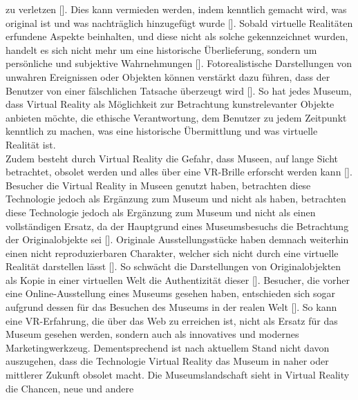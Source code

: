 \documentclass[a4paper,12pt,oneside]{article}
\begin{document}
        zu verletzen [\cite[38]{Heidsiek2019}]. Dies kann vermieden werden, indem 
        kenntlich gemacht wird, was original ist und was nachträglich hinzugefügt
        wurde [\cite[38]{Heidsiek2019}]. Sobald virtuelle Realitäten erfundene Aspekte 
        beinhalten, und diese nicht als solche gekennzeichnet wurden, handelt es sich nicht
        mehr um eine historische Überlieferung, sondern um persönliche und subjektive 
        Wahrnehmungen [\cite[38]{Heidsiek2019}]. Fotorealistische Darstellungen
        von unwahren Ereignissen oder Objekten können verstärkt dazu führen, dass der
        Benutzer von einer fälschlichen Tatsache überzeugt wird [\cite[39]{Heidsiek2019}].
        So hat jedes Museum, dass Virtual Reality als Möglichkeit zur Betrachtung 
        kunstrelevanter Objekte anbieten möchte, die ethische Verantwortung, 
        dem Benutzer zu jedem Zeitpunkt kenntlich zu machen,
        was eine historische Übermittlung und was virtuelle Realität ist. \\
        Zudem besteht durch Virtual Reality die Gefahr, dass Museen, auf lange Sicht 
        betrachtet, obsolet werden und alles über eine VR-Brille erforscht werden kann
        [\cite[142-143]{Huennekens2002}]. Besucher die Virtual Reality in Museen genutzt
        haben, betrachten diese Technologie jedoch als Ergänzung zum Museum und nicht als
        haben, betrachten diese Technologie jedoch als Ergänzung zum Museum und nicht als
        einen vollständigen Ersatz, da der Hauptgrund eines Museumsbesuchs die Betrachtung
        der Originalobjekte sei [\cite[79]{Heidsiek2019}]. Originale Ausstellungsstücke
        haben demnach weiterhin einen nicht reproduzierbaren Charakter, welcher sich nicht 
        durch eine
        virtuelle Realität darstellen lässt [\cite[93]{Heidsiek2019}]. So schwächt die
        Darstellungen von Originalobjekten als Kopie in einer virtuellen Welt
        die Authentizität dieser [\cite[93]{Heidsiek2019}]. 
        Besucher, die vorher eine Online-Ausstellung eines Museums gesehen haben,
        entschieden sich sogar aufgrund dessen für das Besuchen des Museums in der 
        realen Welt [\cite[777-778]{Katz2015}]. So kann eine VR-Erfahrung, die über
        das Web zu erreichen ist, nicht als Ersatz für das Museum gesehen werden,
        sondern auch als innovatives und modernes Marketingwerkzeug.
        Dementsprechend ist nach aktuellem
        Stand nicht davon auszugehen, dass die Technologie Virtual Reality das Museum in
        naher oder mittlerer Zukunft obsolet macht.
        Die Museumslandschaft sieht in Virtual Reality die Chancen, neue und andere
\end{document}
